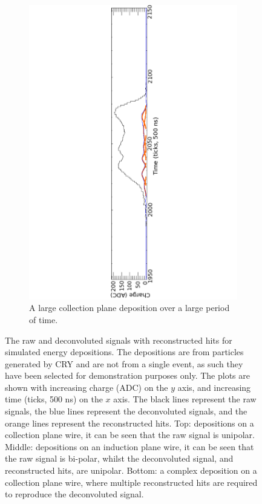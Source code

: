 \begin{figure}
\begin{subfigure}{0.95\textwidth}
    \includegraphics[width=\textwidth]{Complex}
    \caption{A large collection plane deposition over a large period of time.}
    \label{fig:LotsOfHits_Big}
  \end{subfigure}
  \caption[A selection of reconstructed hits from simulated energy depositions]
          {The raw and deconvoluted signals with reconstructed hits for simulated energy depositions. The depositions are from particles generated by CRY and are not from a single event, as such they have been selected for demonstration purposes only. The plots are shown with increasing charge (ADC) on the $y$ axis, and increasing time (ticks, 500 ns) on the $x$ axis. The black lines represent the raw signals, the blue lines represent the deconvoluted signals, and the orange lines represent the reconstructed hits. Top: depositions on a collection plane wire, it can be seen that the raw signal is unipolar. Middle: depositions on an induction plane wire, it can be seen that the raw signal is bi-polar, whilst the deconvoluted signal, and reconstructed hits, are unipolar. Bottom: a complex deposition on a collection plane wire, where multiple reconstructed hits are required to reproduce the deconvoluted signal.}
  \label{fig:LotsOfHits}
\end{figure}


